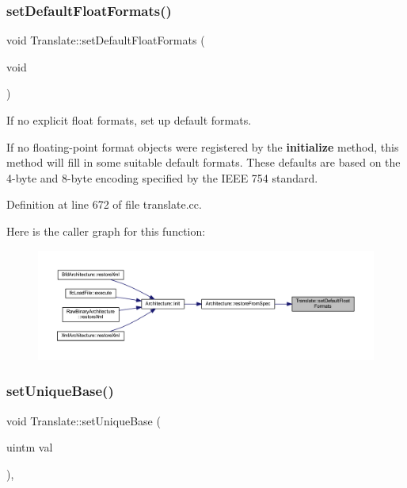 \mbox{\label{class_translate_af3405dfdc80d8742a482193f030601ed}} 
\subsubsection{\texorpdfstring{setDefaultFloatFormats()}{setDefaultFloatFormats()}}
{\footnotesize\ttfamily void Translate\+::set\+Default\+Float\+Formats (\begin{DoxyParamCaption}\item[{void}]{ }\end{DoxyParamCaption})}



If no explicit float formats, set up default formats. 

If no floating-\/point format objects were registered by the {\bfseries{initialize}} method, this method will fill in some suitable default formats. These defaults are based on the 4-\/byte and 8-\/byte encoding specified by the I\+E\+EE 754 standard. 

Definition at line 672 of file translate.\+cc.

Here is the caller graph for this function\+:
\nopagebreak
\begin{figure}[H]
\begin{center}
\leavevmode
\includegraphics[width=350pt]{class_translate_af3405dfdc80d8742a482193f030601ed_icgraph}
\end{center}
\end{figure}
\mbox{\label{class_translate_a57dd5230f05fca5b38e7768472c5b5ee}} 
\subsubsection{\texorpdfstring{setUniqueBase()}{setUniqueBase()}}
{\footnotesize\ttfamily void Translate\+::set\+Unique\+Base (\begin{DoxyParamCaption}\item[{uintm}]{val }\end{DoxyParamCaption})\hspace{0.3cm}{\ttfamily [inline]}, {\ttfamily [protected]}}



